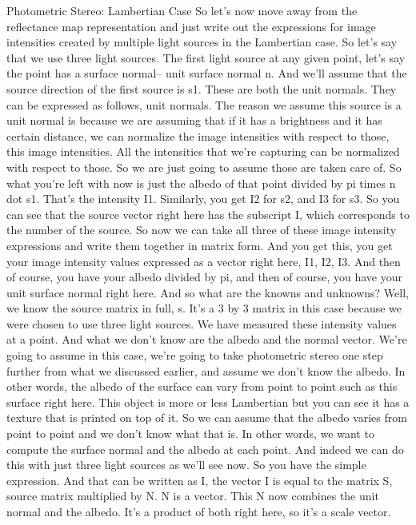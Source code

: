 \documentclass[12pt]{article}
\begin{document}
Photometric Stereo: Lambertian Case
So let's now move away from the reflectance map representation
and just write out the expressions
for image intensities created by multiple light sources
in the Lambertian case.
So let's say that we use three light sources.
The first light source at any given point,
let's say the point has a surface normal--
unit surface normal n.
And we'll assume that the source direction of the first source
is s1.
These are both the unit normals.
They can be expressed as follows, unit normals.
The reason we assume this source is a unit normal
is because we are assuming that if it has a brightness
and it has certain distance, we can normalize the image
intensities with respect to those, this image intensities.
All the intensities that we're capturing
can be normalized with respect to those.
So we are just going to assume those are taken care of.
So what you're left with now is just
the albedo of that point divided by pi times n dot s1.
That's the intensity I1.
Similarly, you get I2 for s2, and I3 for s3.
So you can see that the source vector right here
has the subscript I, which corresponds
to the number of the source.
So now we can take all three of these image intensity
expressions and write them together in matrix form.
And you get this, you get your image intensity values
expressed as a vector right here, I1, I2, I3.
And then of course, you have your albedo divided by pi,
and then of course, you have your unit surface normal right
here.
And so what are the knowns and unknowns?
Well, we know the source matrix in full, s.
It's a 3 by 3 matrix in this case
because we were chosen to use three light sources.
We have measured these intensity values at a point.
And what we don't know are the albedo and the normal vector.
We're going to assume in this case,
we're going to take photometric stereo one step further
from what we discussed earlier, and assume
we don't know the albedo.
In other words, the albedo of the surface
can vary from point to point such as this surface
right here.
This object is more or less Lambertian
but you can see it has a texture that is printed on top of it.
So we can assume that the albedo varies from point to point
and we don't know what that is.
In other words, we want to compute the surface normal
and the albedo at each point.
And indeed we can do this with just three light sources
as we'll see now.
So you have the simple expression.
And that can be written as I, the vector
I is equal to the matrix S, source matrix multiplied
by N. N is a vector.
This N now combines the unit normal and the albedo.
It's a product of both right here, so it's a scale vector.
\end{document}
